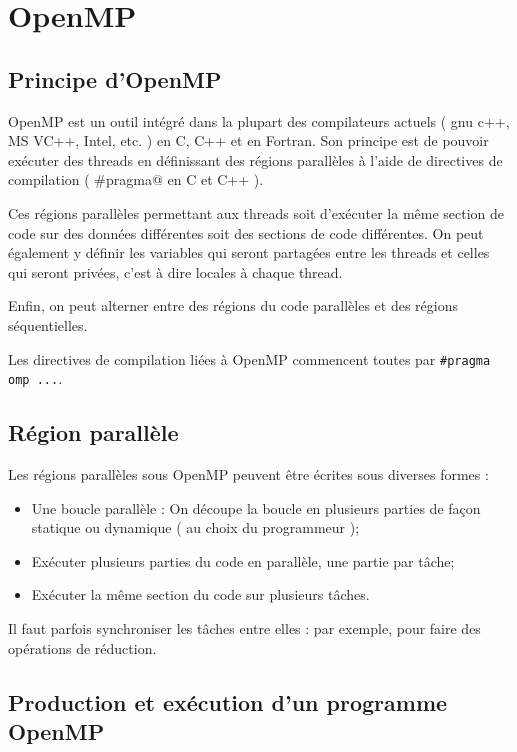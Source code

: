 \documentclass[fleqn,11pt]{article}
\begin{document}
\section{OpenMP}

\subsection{Principe d'OpenMP}

OpenMP est un outil intégré dans la plupart des compilateurs actuels ( gnu c++, MS VC++, Intel, etc. ) en C, C++ et en Fortran. Son principe est de pouvoir exécuter des threads en définissant des régions parallèles à l'aide de directives de compilation ( \lstinline@#pragma@ en C et C++ ).

Ces régions parallèles permettant aux threads soit d'exécuter la même section de code sur des données différentes soit des sections de code différentes. On peut également y définir les variables qui seront partagées entre les threads et celles qui seront privées, c'est à dire locales à chaque thread.

Enfin, on peut alterner entre des régions du code  parallèles et des régions séquentielles.

Les directives de compilation liées à OpenMP commencent toutes par \lstinline{#pragma omp ...}.

\subsection{Région parallèle}

Les régions parallèles sous OpenMP peuvent être écrites sous diverses formes :
\begin{itemize}
 \item Une boucle parallèle : On découpe la boucle en plusieurs parties de façon statique ou dynamique ( au choix du programmeur );
 \item Exécuter plusieurs parties du code en parallèle, une partie par tâche;
 \item Exécuter la même section du code sur plusieurs tâches.
\end{itemize}

Il faut parfois synchroniser les tâches entre elles : par exemple, pour faire des opérations de réduction.

\subsection{Production et exécution d'un programme OpenMP}
\end{document}
